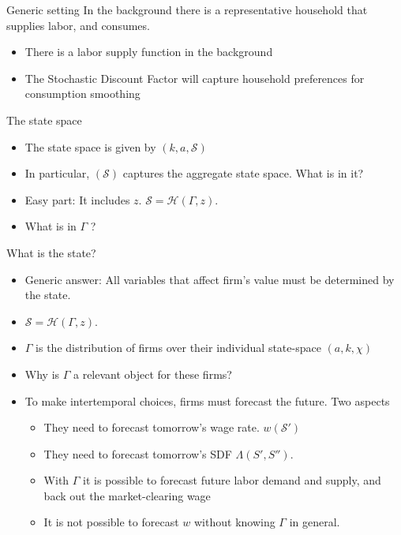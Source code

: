 \documentclass[11pt,aspectratio=169,xcolor={dvipsnames},hyperref={pdftex,pdfpagemode=UseNone,hidelinks,pdfdisplaydoctitle=true},usepdftitle=false]{beamer}
\begin{document}
\begin{frame}{Generic setting}
In the background there is a representative household that supplies labor, and consumes.
\begin{itemize}
\item There is a labor supply function in the background
\item The Stochastic Discount Factor will capture household preferences for consumption smoothing
\end{itemize}
\end{frame}

\begin{frame}{The state space}
\begin{itemize}
\item The state space is given by $(k,a,\mathcal{S})$
\item In particular, $(\mathcal{S})$ captures the aggregate state space. What is in it?
\item Easy part: It includes $z$. $\mathcal{S} = \mathcal{H}(\Gamma,z)$. 
\item What is in $\Gamma$ ?
\end{itemize}
\end{frame}

\begin{frame}{What is the state?}
\begin{itemize}
\item Generic answer: All variables that affect firm's value must be determined by the state.
\item $\mathcal{S} = \mathcal{H}(\Gamma,z)$.
\item $\Gamma$ is the distribution of firms over their individual state-space $(a,k,\chi)$
\item Why is $\Gamma$ a relevant object for these firms?
\item To make intertemporal choices, firms must forecast the future. Two aspects
\begin{itemize}
\item They need to forecast tomorrow's wage rate. $w(\mathcal{S'})$
\item They need to forecast tomorrow's SDF $\Lambda(S',S'')$.
\item With $\Gamma$ it is possible to forecast future labor demand and supply, and back out the market-clearing wage
\item It is not possible to forecast $w$ without knowing $\Gamma$ in general.
\end{itemize}
\end{itemize}
\end{frame}
\end{document}
